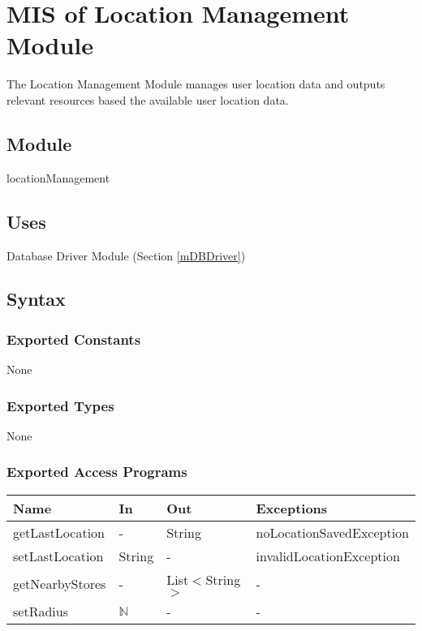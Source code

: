 \documentclass[12pt, titlepage]{article}
\begin{document}
\newpage

\section{MIS of Location Management Module} \label{mLocation} 
The Location Management Module manages user location data and outputs relevant resources based the available user location data.

\subsection{Module}

locationManagement

\subsection{Uses}

Database Driver Module (Section \ref{mDBDriver})

\subsection{Syntax}

\subsubsection{Exported Constants}
None

\subsubsection{Exported Types}

None

\subsubsection{Exported Access Programs}

\begin{center}
\begin{tabular}{p{5cm} p{3cm} p{3cm} p{5cm}}
\hline
\textbf{Name} & \textbf{In} & \textbf{Out} & \textbf{Exceptions} \\
\hline
getLastLocation & - & String & noLocationSavedException \\
setLastLocation & String & - & invalidLocationException \\
getNearbyStores & - & List$<$String$>$ & - \\
setRadius & $\mathbb{N}$ & - & - \\
\hline
\end{tabular}
\end{center}
\end{document}
